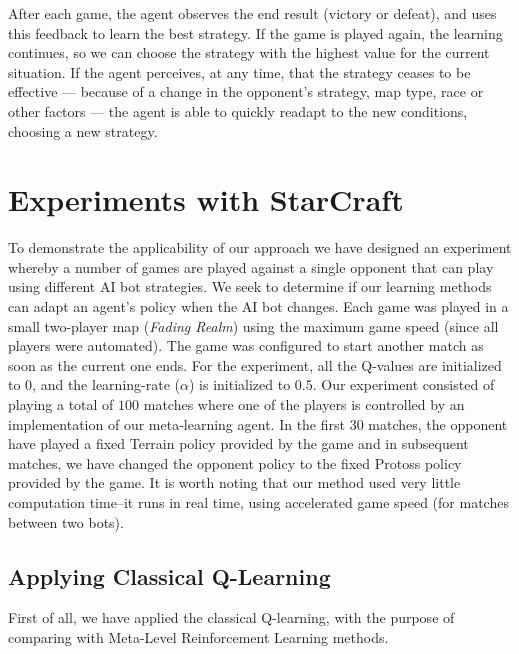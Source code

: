 After each game, the agent observes the end result (victory or defeat), and uses this feedback to learn the best strategy. 
If the game is played again, the learning continues, so we can choose the strategy with the highest value for the current situation. 
If the agent perceives, at any time, that the strategy ceases to be effective 
--- because of a change in the opponent's strategy, map type, race or other factors ---
the agent is able to quickly readapt to the new conditions, choosing a new strategy.



\section{Experiments with StarCraft}
\label{sec:experiments}

To demonstrate the applicability of our approach we have designed an experiment whereby a number of games are played against a single opponent that can play using different AI bot strategies. 
We seek to determine if our learning methods can adapt an agent's policy when the AI bot changes. 
Each game was played in a small two-player map (\textit{Fading Realm}) using the maximum game speed (since all players were automated).
The game was configured to start another match as soon as the current one ends.
For the experiment, all the Q-values are initialized to $0$, and the learning-rate ($\alpha$) is initialized to $0.5$. 
Our experiment consisted of playing a total of $100$ matches where one of the players is controlled by an implementation of our meta-learning agent. 
In the first $30$ matches, the opponent have played a fixed Terrain policy provided by the game and in subsequent matches, we have changed the opponent policy to the fixed Protoss policy provided by the game. 
It is worth noting that our method used very little computation time--it runs in real time, using accelerated game speed (for matches between two bots).



\subsection{Applying Classical Q-Learning}
\label{subsec:applying_ql}

First of all, we have applied the classical Q-learning, with the purpose of comparing with Meta-Level Reinforcement Learning methods.


